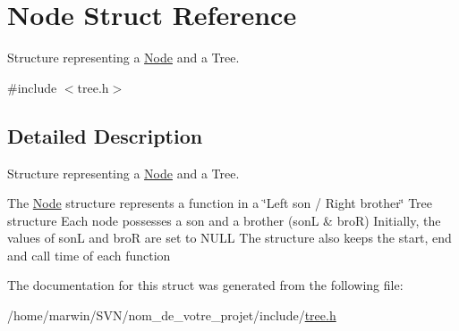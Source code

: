 \hypertarget{struct_node}{\section{Node Struct Reference}
\label{struct_node}
}


Structure representing a \hyperlink{struct_node}{Node} and a Tree.  




{\ttfamily \#include $<$tree.\-h$>$}



\subsection{Detailed Description}
Structure representing a \hyperlink{struct_node}{Node} and a Tree. 

The \hyperlink{struct_node}{Node} structure represents a function in a \char`\"{}\-Left son / Right brother\char`\"{} Tree structure Each node possesses a son and a brother (son\-L \& bro\-R) Initially, the values of son\-L and bro\-R are set to N\-U\-L\-L The structure also keeps the start, end and call time of each function 

The documentation for this struct was generated from the following file\-:\begin{DoxyCompactItemize}
\item 
/home/marwin/\-S\-V\-N/nom\-\_\-de\-\_\-votre\-\_\-projet/include/\hyperlink{tree_8h}{tree.\-h}\end{DoxyCompactItemize}
